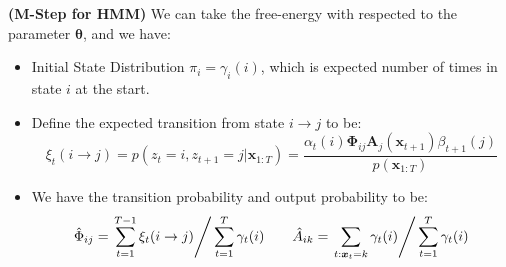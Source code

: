 \begin{proposition}{\textbf{(M-Step for HMM)}}
    We can take the free-energy with respected to the parameter $\boldsymbol \theta$, and we have:
    \begin{itemize}
        \item Initial State Distribution $\pi_i = \gamma_i(i)$, which is expected number of times in state $i$ at the start. 
        \item Define the expected transition from state $i\rightarrow j$ to be:
        \begin{equation*}
            \xi_t(i\rightarrow j) = p(z_t = i, z_{t+1}=j | \boldsymbol x_{1:T}) = \frac{\alpha_t(i)\boldsymbol \Phi_{ij}\boldsymbol A_j(\boldsymbol x_{t+1})\beta_{t+1}(j)}{p(\boldsymbol x_{1:T})}
        \end{equation*}
        \item We have the transition probability and output probability to be:
        \begin{equation*}
            \hat{\Phi}_{ij} = \left.\sum^{T-1}_{t=1} \xi_t(i\rightarrow j) \right/ \sum^T_{t=1}\gamma_t(i) \qquad 
            \hat{A}_{ik} = \left.\sum_{t:\boldsymbol x_t = k} \gamma_t(i) \right/ \sum^T_{t=1}\gamma_t(i)
        \end{equation*}
    \end{itemize}
\end{proposition}
